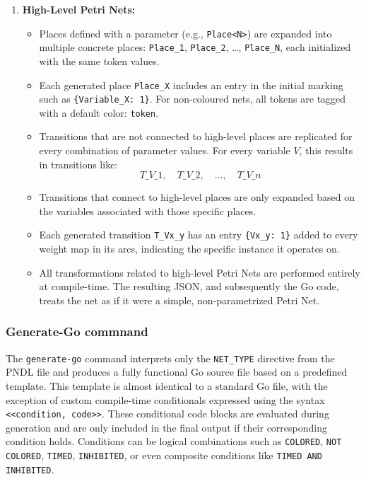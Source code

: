 \documentclass[12pt]{article}
\begin{document}
\begin{enumerate}
            \item \textbf{High-Level Petri Nets:}
            \begin{itemize}
                \item Places defined with a parameter (e.g., \texttt{Place<N>}) are expanded into multiple concrete places: \texttt{Place\_1}, \texttt{Place\_2}, \dots, \texttt{Place\_N}, each initialized with the same token values.
                \item Each generated place \texttt{Place\_X} includes an entry in the initial marking such as \texttt{\{Variable\_X: 1\}}. For non-coloured nets, all tokens are tagged with a default color: \texttt{token}.
                \item Transitions that are not connected to high-level places are replicated for every combination of parameter values. For every variable $V$, this results in transitions like:
                \[
                    T\_V\_1, \quad T\_V\_2, \quad \dots, \quad T\_V\_n
                \]
                \item Transitions that connect to high-level places are only expanded based on the variables associated with those specific places.
                \item Each generated transition \texttt{T\_Vx\_y} has an entry \texttt{\{Vx\_y: 1\}} added to every weight map in its arcs, indicating the specific instance it operates on.
                \item All transformations related to high-level Petri Nets are performed entirely at compile-time. The resulting JSON, and subsequently the Go code, treats the net as if it were a simple, non-parametrized Petri Net.
            \end{itemize}
        \end{enumerate}
        \subsubsection{Generate-Go commnand}
            The \texttt{generate-go} command interprets only the \texttt{NET\_TYPE} directive from the PNDL file and produces a fully functional Go source file based on a predefined template. This template is almost identical to a standard Go file, with the exception of custom compile-time conditionals expressed using the syntax \texttt{<<condition, code>>}. These conditional code blocks are evaluated during generation and are only included in the final output if their corresponding condition holds. Conditions can be logical combinations such as \texttt{COLORED}, \texttt{NOT COLORED}, \texttt{TIMED}, \texttt{INHIBITED}, or even composite conditions like \texttt{TIMED AND INHIBITED}.
\end{document}
